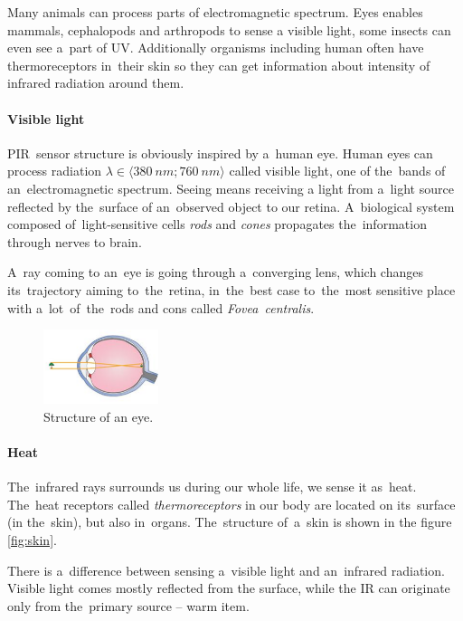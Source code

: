 Many animals can process parts of electromagnetic spectrum. Eyes enables mammals, cephalopods and arthropods
to sense a visible light, some insects can even see a~part of UV. Additionally organisms including human often
have thermoreceptors in~their skin so they can get information about intensity of infrared radiation around them.


\paragraph{Visible light}
\label{subsection:eye}
PIR~sensor structure is obviously inspired by a~human eye. Human eyes can process radiation
$\lambda \in \langle 380~nm;760~nm \rangle$ called visible light, one of the~bands of an~electromagnetic spectrum.
Seeing means receiving a light from a~light source reflected by the~surface of an~observed object to our retina.
A~biological system composed of~light-sensitive cells {\it rods} and {\it cones} propagates the~information
through nerves to brain.

A~ray coming to an~eye is going through a~converging lens, which changes its~trajectory aiming to~the~retina,
in~the~best case to~the~most sensitive place with a~lot~of~the~rods and cons called {\it Fovea~centralis}.
\cite{LightEyeVision}

\begin{figure}[h!]
\begin{center}
\includegraphics[width=0.3\textwidth]{obrazky-figures/eye.png}
\caption{Structure of an eye. \cite{Eye}\label{fig:eye}}
\end{center}    
\end{figure}


\paragraph{Heat}
The~infrared rays surrounds us during our whole life, we sense it as~heat. The~heat receptors called
{\it thermoreceptors} in our body are located on its~surface (in the~skin), but also in~organs.
The~structure of~a~skin is shown in the figure \ref{fig:skin}. 

There is a~difference between sensing a~visible light and an~infrared radiation. Visible light comes
mostly reflected from the surface, while the IR can originate only from the~primary source -- warm item.

